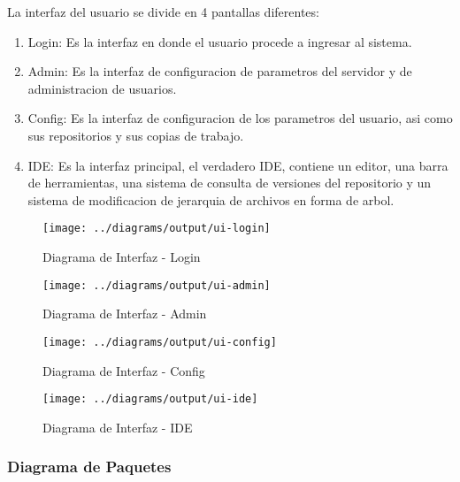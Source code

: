 La interfaz del usuario se divide en 4 pantallas diferentes:

\begin{enumerate}

	\item Login: Es la interfaz en donde el usuario procede a ingresar al sistema.
	
	\item Admin: Es la interfaz de configuracion de parametros del servidor y de administracion de usuarios.
	
	\item Config: Es la interfaz de configuracion de los parametros del usuario, asi como sus repositorios y sus copias de trabajo.
	
	\item IDE: Es la interfaz principal, el verdadero IDE, contiene un editor, una barra de herramientas, una sistema de consulta de versiones del repositorio y un sistema de modificacion de jerarquia de archivos en forma de arbol.

\end{enumerate}

\begin{landscape}
\begin{figure}
 \centering
 \texttt{[image: ../diagrams/output/ui-login]}
 \caption{Diagrama de Interfaz - Login}
 \label{diagrama:ui-login}
\end{figure}
\end{landscape}

\begin{figure}
 \centering
 \texttt{[image: ../diagrams/output/ui-admin]}
 \caption{Diagrama de Interfaz - Admin}
 \label{diagrama:ui-admin}
\end{figure}

\begin{figure}
 \centering
 \texttt{[image: ../diagrams/output/ui-config]}
 \caption{Diagrama de Interfaz - Config}
 \label{diagrama:ui-config}
\end{figure}

\begin{landscape}
\begin{figure}
 \centering
 \texttt{[image: ../diagrams/output/ui-ide]}
 \caption{Diagrama de Interfaz - IDE}
 \label{diagrama:ui-ide}
\end{figure}
\end{landscape}


\subsubsection{Diagrama de Paquetes}

